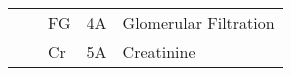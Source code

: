 \begin{table}[!htp]
{\begin{tabular}{|l|l|l|l|l|}
                       &                                                                                          & FG                  & 4A            & Glomerular Filtration                                                                                             \\ \cline{3-5} 
                       &                                                                                          & Cr                  & 5A            & Creatinine                                                                                                        \\ \hline
\end{tabular}}
\label{tab1}
\end{table}

